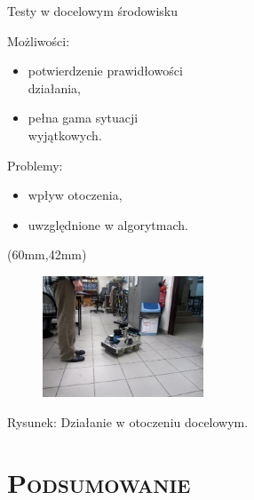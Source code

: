 \documentclass[xcolor=x11names,compress]{beamer}
\renewcommand{\(}{\begin{columns}}
\renewcommand{\)}{\end{columns}}
\newcommand{\<}[1]{\begin{column}{#1}}
\renewcommand{\>}{\end{column}}
\begin{document}
\begin{frame}{Testy w docelowym środowisku}

\alert{Możliwości:}
\begin{itemize}
\item potwierdzenie prawidłowości \\działania,
\item pełna gama sytuacji \\wyjątkowych.
\end{itemize}

\vspace{.7cm}

\alert{Problemy:}
\begin{itemize}
\item wpływ otoczenia,
\item uwzględnione w algorytmach.
\end{itemize}

\begin{textblock*}{70mm}(60mm,42mm)%
    \begin{minipage}[c]{70mm}%
	\begin{figure}[h!]
	\includegraphics[width=4.8cm]{../Common/img/test_2}
	\end{figure}
	\hspace{1cm}\scriptsize \alert{Rysunek:} Działanie w otoczeniu docelowym.
    \end{minipage}
\end{textblock*}

\end{frame}

\section{\scshape Podsumowanie}
\end{document}
